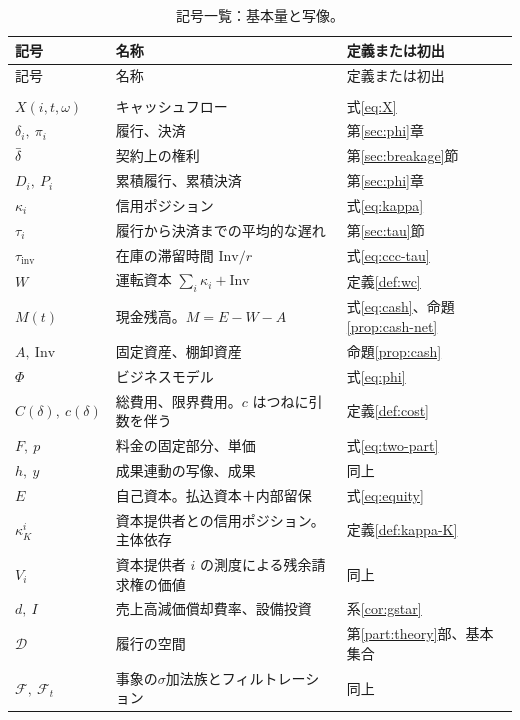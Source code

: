 \begin{longtable}{@{}>{\raggedright\arraybackslash}p{}>{\raggedright\arraybackslash}p{}>{\raggedright\arraybackslash}p{}@{}}
\caption{記号一覧：基本量と写像。}\label{tab:notation-basic}\\
\toprule
記号 & 名称 & 定義または初出 \\
\midrule
\endfirsthead
\toprule
記号 & 名称 & 定義または初出 \\
\midrule
\endhead
\midrule
\multicolumn{3}{r}{\footnotesize（次頁へ続く）}\\
\endfoot
\bottomrule
\endlastfoot
$X(i,t,\omega)$ & キャッシュフロー & 式\eqref{eq:X} \\
$\delta_i,\ \pi_i$ & 履行、決済 & 第\ref{sec:phi}章 \\
$\dbar$ & 契約上の権利 & 第\ref{sec:breakage}節 \\
$D_i,\ P_i$ & 累積履行、累積決済 & 第\ref{sec:phi}章 \\
$\kappa_i$ & 信用ポジション & 式\eqref{eq:kappa} \\
$\tau_i$ & 履行から決済までの平均的な遅れ & 第\ref{sec:tau}節 \\
$\tau_{\mathrm{inv}}$ & 在庫の滞留時間 $\mathrm{Inv}/r$ & 式\eqref{eq:ccc-tau} \\
$W$ & 運転資本 $\sum_i\kappa_i+\mathrm{Inv}$ & 定義\ref{def:wc} \\
$M(t)$ & 現金残高。$M=E-W-A$ & 式\eqref{eq:cash}、命題\ref{prop:cash-net} \\
$A,\ \mathrm{Inv}$ & 固定資産、棚卸資産 & 命題\ref{prop:cash} \\
$\Phi$ & ビジネスモデル & 式\eqref{eq:phi} \\
$C(\delta),\ c(\delta)$ & 総費用、限界費用。$c$ はつねに引数を伴う & 定義\ref{def:cost} \\
$F,\ p$ & 料金の固定部分、単価 & 式\eqref{eq:two-part} \\
$h,\ y$ & 成果連動の写像、成果 & 同上 \\
$E$ & 自己資本。払込資本＋内部留保 & 式\eqref{eq:equity} \\
$\kappa_K^{i}$ & 資本提供者との信用ポジション。主体依存 & 定義\ref{def:kappa-K} \\
$V_i$ & 資本提供者 $i$ の測度による残余請求権の価値 & 同上 \\
$d,\ I$ & 売上高減価償却費率、設備投資 & 系\ref{cor:gstar} \\
$\mathcal{D}$ & 履行の空間 & 第\ref{part:theory}部、基本集合 \\
$\mathcal{F},\ \mathcal{F}_t$ & 事象の$\sigma$加法族とフィルトレーション & 同上 \\
\end{longtable}

